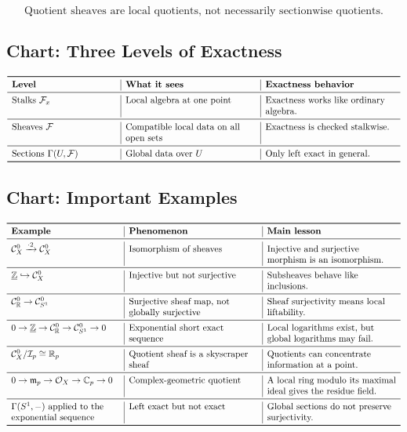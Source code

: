 \documentclass[12pt,a4paper]{article}
\newcommand{\F}{\mathcal F}
\newcommand{\RR}{\mathbb{R}}
\newcommand{\ZZ}{\mathbb{Z}}
\newcommand{\Czero}{\mathcal C^0}        %
\newcommand{\CC}{\mathbb{C}}
\newcommand{\OO}{\mathcal{O}}
\theoremstyle{notespace}
\newcommand{\SSone}{S^1}
\begin{document}
\[
\boxed{
	\text{Quotient sheaves are local quotients, not necessarily sectionwise quotients.}
}
\]

\subsection{Chart: Three Levels of Exactness}

\[
\begin{array}{>{\raggedright\arraybackslash}p{4cm}
		|>{\raggedright\arraybackslash}p{5cm}
		|>{\raggedright\arraybackslash}p{5cm}}
	\toprule
	\textbf{Level} & \textbf{What it sees} & \textbf{Exactness behavior} \\
	\midrule
	Stalks \(\F_x\)
	&
	Local algebra at one point
	&
	Exactness works like ordinary algebra.
	\\
	\midrule
	Sheaves \(\F\)
	&
	Compatible local data on all open sets
	&
	Exactness is checked stalkwise.
	\\
	\midrule
	Sections \(\Gamma(U,\F)\)
	&
	Global data over \(U\)
	&
	Only left exact in general.
	\\
	\bottomrule
\end{array}
\]

\subsection{Chart: Important Examples}

\[
\begin{array}{>{\raggedright\arraybackslash}p{4.2cm}
		|>{\raggedright\arraybackslash}p{5cm}
		|>{\raggedright\arraybackslash}p{5cm}}
	\toprule
	\textbf{Example} & \textbf{Phenomenon} & \textbf{Main lesson} \\
	\midrule
	\(\Czero_X\xrightarrow{\cdot 2}\Czero_X\)
	&
	Isomorphism of sheaves
	&
	Injective and surjective morphism is an isomorphism.
	\\
	\midrule
	\(\underline{\ZZ}\hookrightarrow \Czero_X\)
	&
	Injective but not surjective
	&
	Subsheaves behave like inclusions.
	\\
	\midrule
	\(\Czero_{\RR}\to \Czero_{\SSone}\)
	&
	Surjective sheaf map, not globally surjective
	&
	Sheaf surjectivity means local liftability.
	\\
	\midrule
	\(0\to \underline{\ZZ}\to \Czero_{\RR}\to \Czero_{\SSone}\to 0\)
	&
	Exponential short exact sequence
	&
	Local logarithms exist, but global logarithms may fail.
	\\
	\midrule
	\(\Czero_X/\mathcal I_p\cong \RR_p\)
	&
	Quotient sheaf is a skyscraper sheaf
	&
	Quotients can concentrate information at a point.
	\\
	\midrule
	\(0\to \mathfrak m_p\to \OO_X\to \CC_p\to 0\)
	&
	Complex-geometric quotient
	&
	A local ring modulo its maximal ideal gives the residue field.
	\\
	\midrule
	\(\Gamma(S^1,-)\) applied to the exponential sequence
	&
	Left exact but not exact
	&
	Global sections do not preserve surjectivity.
	\\
	\bottomrule
\end{array}
\]
\end{document}
